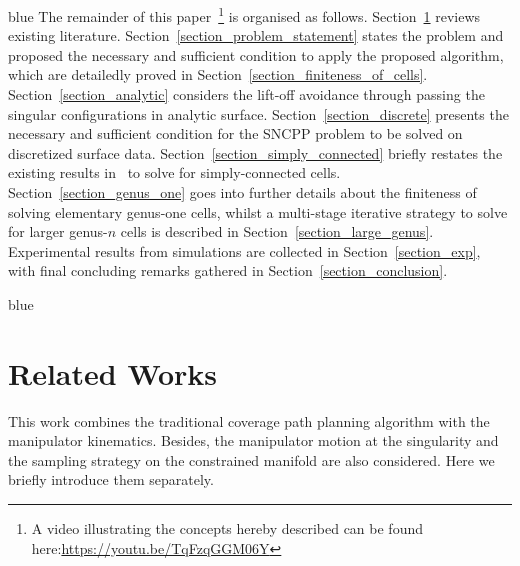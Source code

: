 \documentclass[Afour,sageh,times]{sagej}
\begin{document}
\begin{color}{blue}
The remainder of this paper~\footnote{A video illustrating the concepts hereby described can be found 
here:\url{https://youtu.be/TqFzqGGM06Y}} is organised as follows. 
Section~\ref{section_related_works} reviews existing literature. 
Section~\ref{section_problem_statement} states the problem and proposed the necessary and sufficient condition to apply the proposed algorithm, which are detailedly proved in Section~\ref{section_finiteness_of_cells}. 
Section~\ref{section_analytic} considers the lift-off avoidance through passing the singular configurations in analytic surface.
Section~\ref{section_discrete} presents the necessary and sufficient condition for the SNCPP problem to be solved on discretized surface data. 
Section~\ref{section_simply_connected} briefly restates the existing results in~\cite{Yang2020Cellular} to solve for 
simply-connected cells. 
Section~\ref{section_genus_one} goes into further details about the finiteness of solving elementary genus-one cells, whilst 
a multi-stage iterative strategy to solve for larger genus-$n$ cells is described in Section~\ref{section_large_genus}.
Experimental results from simulations are collected in Section~\ref{section_exp}, with final concluding remarks gathered in 
Section~\ref{section_conclusion}.
\end{color}

\begin{color}{blue}
\section{Related Works}\label{section_related_works}
\end{color}

This work combines the traditional coverage path planning algorithm with the manipulator kinematics. Besides, the manipulator motion at the singularity and the sampling strategy on the constrained manifold are also considered. Here we briefly introduce them separately.  
\end{document}
